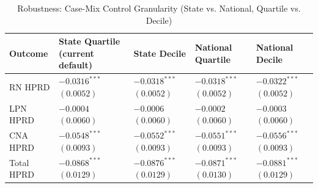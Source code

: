 \documentclass[12pt]{article}
\begin{document}
\begin{table}[H]
\centering
\begin{threeparttable}
\caption{Robustness: Case-Mix Control Granularity (State vs. National, Quartile vs. Decile)}
\label{tab:robustness-case-mix-bins}
\small
\setlength{\tabcolsep}{6pt}
\begin{tabularx}{\textwidth}{@{} l Y Y Y Y @{}}
\toprule
Outcome & State Quartile (current default) & State Decile & National Quartile & National Decile \\
\midrule
RN HPRD &  &  &  &  \\
LPN HPRD &  &  &  &  \\
CNA HPRD &  &  &  &  \\
Total HPRD &  &  &  &  \\
\bottomrule
\end{tabularx}


\end{threeparttable}
\end{table}
\end{document}

